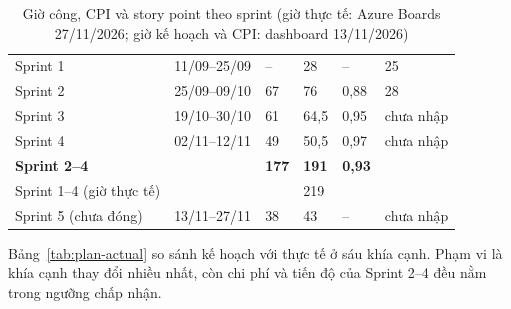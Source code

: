 \documentclass[12pt,a4paper]{report}
\begin{document}
\begin{table}[htbp]
  \centering
  \caption{Giờ công, CPI và story point theo sprint (giờ thực tế: Azure Boards 27/11/2026; giờ kế hoạch và CPI: dashboard 13/11/2026)}
  \label{tab:sprint-hours}
  \small
  \begin{tabularx}{\linewidth}{@{}LQ{2.4cm}Q{1.7cm}Q{1.7cm}Q{1.5cm}Q{1.7cm}@{}}
    \toprule
     &  &  &  &  &  \\
    \midrule
    Sprint 1 & 11/09--25/09 & -- & 28 & -- & 25 \\
    Sprint 2 & 25/09--09/10 & 67 & 76 & 0,88 & 28 \\
    Sprint 3 & 19/10--30/10 & 61 & 64,5 & 0,95 & chưa nhập \\
    Sprint 4 & 02/11--12/11 & 49 & 50,5 & 0,97 & chưa nhập \\
    \midrule
    \textbf{Sprint 2--4} & & \textbf{177} & \textbf{191} & \textbf{0,93} & \\
    Sprint 1--4 (giờ thực tế) & & & 219 & & \\
    \midrule
    Sprint 5 (chưa đóng) & 13/11--27/11 & 38 & 43 & -- & chưa nhập \\
    \bottomrule
  \end{tabularx}
\end{table}

Bảng~\ref{tab:plan-actual} so sánh kế hoạch với thực tế ở sáu khía cạnh. Phạm vi là khía cạnh thay đổi nhiều nhất,
còn chi phí và tiến độ của Sprint 2--4 đều nằm trong ngưỡng chấp nhận.
\end{document}
